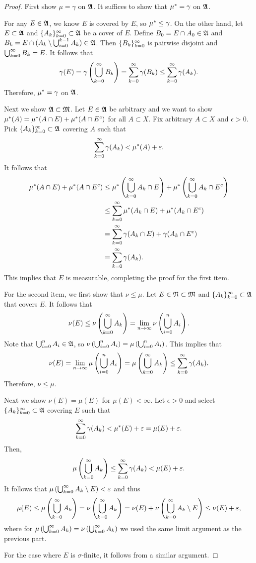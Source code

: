 \documentclass[a4paper]{article}
\begin{document}
\begin{proof}
First show $\mu = \gamma$ on $\mathfrak{A}$. 
It suffices to show that $\mu^* = \gamma$ on $\mathfrak{A}$.

For any $E \in \mathfrak{A}$, we know $E$ is covered by $E$, so 
$\mu^* \leq \gamma$. On the other hand, let $E \subset \mathfrak{A}$
and $\{ A_k \}_{k=0}^\infty \subset \mathfrak{A}$ be a cover of $E$.
Define $B_0 = E \cap A_0 \in \mathfrak{A}$ and 
$B_k = E \cap (A_k \setminus \bigcup_{i=0}^{k-1} A_k) \in \mathfrak{A}$.
Then $\{ B_k \}_{k=0}^\infty$ is pairwise disjoint and 
$\bigcup_{k=0}^\infty B_k = E$. It follows that 
\[
\gamma(E) = \gamma \left( \bigcup_{k=0}^\infty B_k \right)
= \sum_{k=0}^\infty \gamma(B_k) \leq \sum_{k=0}^\infty \gamma(A_k).
\]
Therefore, $\mu^* = \gamma$ on $\mathfrak{A}$. 

Next we show $\mathfrak{A} \subset \mathfrak{M}$. Let $E \in \mathfrak{A}$
be arbitrary and we want to show $\mu^*(A) 
= \mu^*(A \cap E) + \mu^* (A \cap E^c)$ for all 
$A \subset X$. Fix arbitrary $A \subset X$ and 
$\epsilon > 0$. Pick $\{ A_k \}_{k=0}^\infty \subset \mathfrak{A}$
covering $A$ such that 
\[
\sum_{k=0}^\infty \gamma (A_k) < \mu^*(A) + \varepsilon.
\]
It follows that 
\[
\begin{aligned}
\mu^*(A \cap E) + \mu^*(A \cap E^c) 
&\leq \mu^* \left( \bigcup_{k=0}^\infty A_k \cap E \right)
+ \mu^* \left( \bigcup_{k=0}^\infty A_k \cap E^c \right) \\ 
&\leq \sum_{k=0}^\infty \mu^*(A_k \cap E) + \mu^*(A_k \cap E^c) \\
&= \sum_{k=0}^\infty \gamma(A_k \cap E) + \gamma(A_k \cap E^c) \\
&= \sum_{k=0}^\infty \gamma(A_k).
\end{aligned}
\]
This implies that $E$ is measurable, completing the proof 
for the first item.

For the second item, we first show that $\nu \leq \mu$.
Let $E \in \mathfrak{N} \subset \mathfrak{M}$ and $\{ A_k \}_{k=0}^\infty \subset \mathfrak{A}$ 
that covers $E$. It follows that 
\[
\nu(E) \leq \nu \left( \bigcup_{k=0}^\infty A_k \right)
= \lim_{n \to \infty} \nu \left( \bigcup_{i=0}^n A_i \right).
\]
Note that $\bigcup_{i=0}^n A_i \in \mathfrak{A}$, so 
$\nu \left( \bigcup_{i=0}^n A_i \right) = \mu \left( \bigcup_{i=0}^n 
A_i \right)$. This implies that 
\[
\nu(E) = \lim_{n \to \infty} \mu \left( \bigcup_{i=0}^n A_i \right)
= \mu \left( \bigcup_{k=0}^\infty A_k \right) \leq \sum_{k=0}^\infty \gamma(A_k).
\]
Therefore, $\nu \leq \mu$. 

Next we show $\nu(E) = \mu(E)$ for $\mu(E) < \infty$. 
Let $\epsilon > 0$ and select $\{ A_k \}_{k=0}^\infty \subset \mathfrak{A}$
covering $E$ such that 
\[
\sum_{k=0}^\infty \gamma(A_k) < \mu^*(E) + \varepsilon = \mu(E) + \varepsilon.
\]
Then, 
\[
\mu \left( \bigcup_{k=0}^\infty A_k \right) 
\leq \sum_{k=0}^\infty \gamma(A_k) < \mu(E) + \varepsilon.
\]
It follows that $\mu \left( \bigcup_{k=0}^\infty A_k \setminus E \right)
< \varepsilon$ and thus 
\[
\begin{aligned}
\mu(E) 
\leq \mu \left( \bigcup_{k=0}^\infty A_k \right) 
= \nu \left( \bigcup_{k=0}^\infty A_k \right) 
= \nu (E) + \nu \left( \bigcup_{k=0}^\infty A_k \setminus E \right)
\leq \nu(E) + \varepsilon,
\end{aligned}
\]
where for $\mu \left( \bigcup_{k=0}^\infty A_k \right)
= \nu \left( \bigcup_{k=0}^\infty A_k \right)$ we used the same limit argument 
as the previous part.

For the case where $E$ is $\sigma$-finite, it follows from 
a similar argument.

\end{proof}
\end{document}
